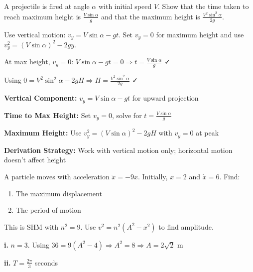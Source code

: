 \begin{problem}
A projectile is fired at angle $\alpha$ with initial speed $V$. Show that the time taken to reach maximum height is $\frac{V\sin\alpha}{g}$ and that the maximum height is $\frac{V^2\sin^2\alpha}{2g}$.
\end{problem}

\begin{hint}
Use vertical motion: $v_y = V\sin\alpha - gt$. Set $v_y = 0$ for maximum height and use $v_y^2 = (V\sin\alpha)^2 - 2gy$.
\end{hint}

\begin{solution}
At max height, $v_y = 0$: $V\sin\alpha - gt = 0 \Rightarrow t = \frac{V\sin\alpha}{g}$ ✓

Using $0 = V^2\sin^2\alpha - 2gH \Rightarrow H = \frac{V^2\sin^2\alpha}{2g}$ ✓
\end{solution}

\begin{takeaways}
\item \textbf{Vertical Component:} $v_y = V\sin\alpha - gt$ for upward projection
\item \textbf{Time to Max Height:} Set $v_y = 0$, solve for $t = \frac{V\sin\alpha}{g}$
\item \textbf{Maximum Height:} Use $v_y^2 = (V\sin\alpha)^2 - 2gH$ with $v_y = 0$ at peak
\item \textbf{Derivation Strategy:} Work with vertical motion only; horizontal motion doesn't affect height
\end{takeaways}

\begin{problem}
A particle moves with acceleration $\ddot{x} = -9x$. Initially, $x = 2$ and $\dot{x} = 6$. Find:
\begin{enumerate}[label=\textbf{\roman*.}]
    \item The maximum displacement
    \item The period of motion
\end{enumerate}
\end{problem}

\begin{hint}
This is SHM with $n^2 = 9$. Use $v^2 = n^2(A^2 - x^2)$ to find amplitude.
\end{hint}

\begin{solution}
\textbf{i.} $n = 3$. Using $36 = 9(A^2 - 4) \Rightarrow A^2 = 8 \Rightarrow A = 2\sqrt{2}$ m

\textbf{ii.} $T = \frac{2\pi}{3}$ seconds
\end{solution}

